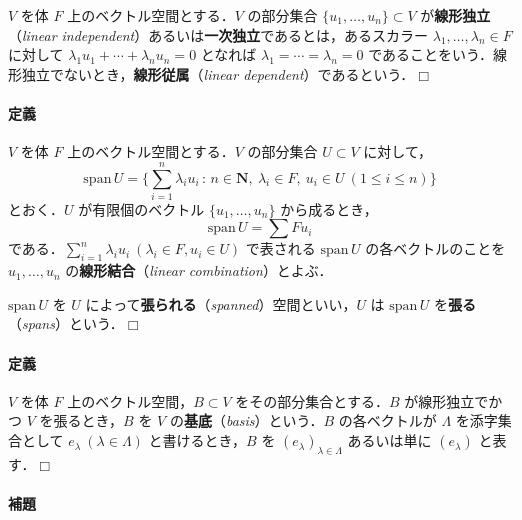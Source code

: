\documentclass[b5paper,pandoc]{bxjsarticle}
\let\oldparagraph\paragraph
\renewcommand{\paragraph}[1]{\oldparagraph{#1}\mbox{}}
\begin{document}
\(V\) を体 \(F\) 上のベクトル空間とする．\(V\) の部分集合
\(\{ u_1, \dotsc, u_n \} \subset V\) が\textbf{線形独立}（\emph{linear
independent}）あるいは\textbf{一次独立}であるとは，あるスカラー
\(\lambda_1, \dotsc, \lambda_n \in F\) に対して
\(\lambda_1 u_1 + \dotsb + \lambda_n u_n = 0\) となれば
\(\lambda_1 = \dotsb = \lambda_n = 0\)
であることをいう．線形独立でないとき，\textbf{線形従属}（\emph{linear
dependent}）であるという．\(\Box\)

\hypertarget{spanned-space}{%
\paragraph{定義}\label{spanned-space}}

\(V\) を体 \(F\) 上のベクトル空間とする．\(V\) の部分集合
\(U \subset V\) に対して， \[
\mathrm{span}\,U = \{ \sum_{i = 1}^n \lambda_i u_i \,:\,n \in \boldsymbol N,\ \lambda_i \in F,\ u_i \in U \ (1 \le i \le n) \}
\] とおく．\(U\) が有限個のベクトル \(\{ u_1, \dotsc, u_n \}\)
から成るとき， \[
\mathrm{span}\,U = \sum Fu_i
\]
である．\(\sum_{i = 1}^n \lambda_i u_i \ (\lambda_i \in F, u_i \in U)\)
で表される \(\mathrm{span}\,U\) の各ベクトルのことを
\(u_1, \dotsc, u_n\) の\textbf{線形結合}（\emph{linear
combination}）とよぶ．

\(\mathrm{span}\,U\) を \(U\)
によって\textbf{張られる}（\emph{spanned}）空間といい，\(U\) は
\(\mathrm{span}\,U\) を\textbf{張る}（\emph{spans}）という．\(\Box\)

\hypertarget{basis-for-vector-space}{%
\paragraph{定義}\label{basis-for-vector-space}}

\(V\) を体 \(F\) 上のベクトル空間，\(B \subset V\)
をその部分集合とする．\(B\) が線形独立でかつ \(V\) を張るとき，\(B\) を
\(V\) の\textbf{基底}（\emph{basis}）という．\(B\) の各ベクトルが
\(\Lambda\) を添字集合として \(e_\lambda \ (\lambda \in \Lambda)\)
と書けるとき，\(B\) を \((e_\lambda)_{\lambda \in \Lambda}\)
あるいは単に \((e_\lambda)\) と表す．\(\Box\)

\hypertarget{number-of-basis-is-inv}{%
\paragraph{補題}\label{number-of-basis-is-inv}}
\end{document}
